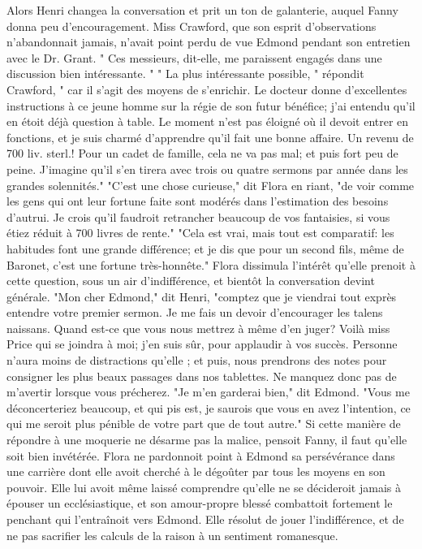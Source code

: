 Alors Henri changea la conversation et prit un ton de galanterie, auquel Fanny donna peu d'encouragement.
Miss Crawford, que son esprit d'observations n'abandonnait jamais, n'avait point perdu de vue Edmond pendant son entretien avec le Dr. Grant.
" Ces messieurs, dit-elle, me paraissent engagés dans une discussion bien intéressante. "
" La plus intéressante possible, " répondit Crawford, " car il s'agit des moyens de s'enrichir. Le docteur donne d'excellentes instructions\setcounter{page}{248} à ce jeune homme sur la régie de son futur bénéfice; j'ai entendu qu'il en étoit déjà question à table. Le moment n'est pas éloigné où il devoit entrer en fonctions, et je suis charmé d'apprendre qu'il fait une bonne affaire. Un revenu de 700 liv. sterl.! Pour un cadet de famille, cela ne va pas mal; et puis fort peu de peine. J'imagine qu'il s'en tirera avec trois ou quatre sermons par année dans les grandes solennités."
"C'est une chose curieuse," dit Flora en riant, "de voir comme les gens qui ont leur fortune faite sont modérés dans l'estimation des besoins d'autrui. Je crois qu'il faudroit retrancher beaucoup de vos fantaisies, si vous étiez réduit à 700 livres de rente."
"Cela est vrai, mais tout est comparatif: les habitudes font une grande différence; et je dis que pour un second fils, même de Baronet, c'est une fortune très-honnête."
Flora dissimula l'intérêt qu'elle prenoit à cette question, sous un air d'indifférence, et bientôt la conversation devint générale.
"Mon cher Edmond," dit Henri, "comptez que je viendrai tout exprès entendre votre premier sermon. Je me fais un devoir d'encourager les talens naissans. Quand est-ce que vous nous mettrez à même d'en juger? Voilà miss Price qui se joindra à moi; j'en\setcounter{page}{249} suis sûr, pour applaudir à vos succès. Personne n'aura moins de distractions qu'elle ; et puis, nous prendrons des notes pour consigner les plus beaux passages dans nos tablettes. Ne manquez donc pas de m'avertir lorsque vous précherez.
"Je m'en garderai bien," dit Edmond. "Vous me déconcerteriez beaucoup, et qui pis est, je saurois que vous en avez l'intention, ce qui me seroit plus pénible de votre part que de tout autre."
Si cette manière de répondre à une moquerie ne désarme pas la malice, pensoit Fanny, il faut qu'elle soit bien invétérée.
Flora ne pardonnoit point à Edmond sa persévérance dans une carrière dont elle avoit cherché à le dégoûter par tous les moyens en son pouvoir. Elle lui avoit même laissé comprendre qu'elle ne se décideroit jamais à épouser un ecclésiastique, et son amour-propre blessé combattoit fortement le penchant qui l'entraînoit vers Edmond. Elle résolut de jouer l'indifférence, et de ne pas sacrifier les calculs de la raison à un sentiment romanesque.

